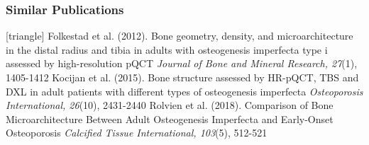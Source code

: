 \documentclass[xcolor=table]{beamer}
\begin{document}

\begin{frame}
	\frametitle{Similar Publications}
	\footnotesize{
		\begin{thebibliography}{99}
			[triangle]
			 Folkestad et al. (2012).
			\newblock Bone geometry, density, and microarchitecture in the distal radius and tibia in adults with osteogenesis imperfecta type i assessed by high-resolution pQCT
			\newblock \textit{Journal of Bone and Mineral Research, 27}(1), 1405-1412
			\vspace{1mm}
			 Kocijan et al. (2015).
			\newblock Bone structure assessed by HR-pQCT, TBS and DXL in adult patients with different types of osteogenesis imperfecta
			\newblock \textit{Osteoporosis International, 26}(10), 2431-2440
			\vspace{1mm}
			 Rolvien et al. (2018).
			\newblock Comparison of Bone Microarchitecture Between Adult Osteogenesis Imperfecta and Early-Onset Osteoporosis
			\newblock \textit{Calcified Tissue International, 103}(5), 512-521
		\end{thebibliography}
	}
\end{frame}

\end{document}
